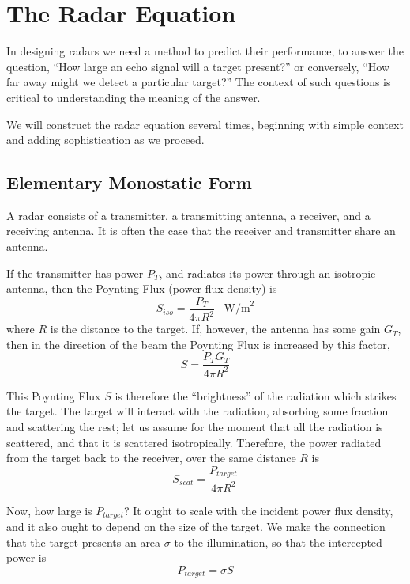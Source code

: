 \chapter{The Radar Equation}

In designing radars we need a method to predict their performance, to
answer the question, ``How large an echo signal will a target
present?'' or conversely, ``How far away might we detect a particular
target?''  The context of such questions is critical to understanding
the meaning of the answer.

We will construct the radar equation several times, beginning with
simple context and adding sophistication as we proceed.

\section{Elementary Monostatic Form}

A radar consists of a transmitter, a transmitting antenna, a receiver,
and a receiving antenna.  It is often the case that the receiver and
transmitter share an antenna.

If the transmitter has power $P_T$, and radiates its power through an
isotropic antenna, then the Poynting Flux (power flux density) is 
\begin{equation}
S_{iso} = \frac{P_T}{4\pi R^2} \;\;\; \textrm{W/m}^2
\end{equation}
where $R$ is the distance to the target.  If, however, the antenna has
some gain $G_T$, then in the direction of the beam the Poynting Flux
is increased by this factor, 
\begin{equation}
S = \frac{P_T G_T}{4\pi R^2}
\end{equation}

This Poynting Flux $S$ is therefore the ``brightness'' of the
radiation which strikes the target.  The target will interact with the
radiation, absorbing some fraction and scattering the rest; let us
assume for the moment that all the radiation is scattered, and that it
is scattered isotropically.  Therefore, the power radiated from the
target back to the receiver, over the same distance $R$ is
\begin{equation} \label{e:rcs1}
S_{scat} = \frac{P_{target}}{4\pi R^2}
\end{equation}

Now, how large is $P_{target}$?  It ought to scale with the incident
power flux density, and it also ought to depend on the size of the
target.  We make the connection that the target presents an area
$\sigma$ to the illumination, so that the intercepted power is
\begin{equation}
P_{target} = \sigma S
\end{equation}

